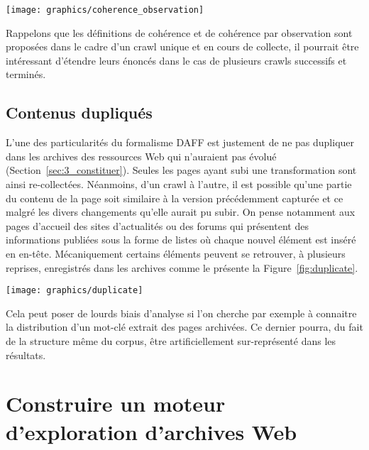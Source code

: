 \documentclass[symmetric,justified,marginals=raggedouter]{tufte-book}
\begin{document}
\begin{figure*}%
  \texttt{[image: graphics/coherence\_observation]}
  \caption{Cohérence par observation entre les pages $p_1$ et $p_2$ et intervalle de cohérence (jaune)}
  \label{fig:coherence}
\end{figure*}

\noindent Rappelons que les définitions de cohérence et de cohérence par observation sont proposées dans le cadre d'un crawl unique et en cours de collecte, il pourrait être intéressant d'étendre leurs énoncés dans le cas de plusieurs crawls successifs et terminés.

\newpage

\subsection{Contenus dupliqués}

\noindent L'une des particularités du formalisme DAFF est justement de ne pas dupliquer dans les archives des ressources Web qui n'auraient pas évolué (Section~\ref{sec:3_constituer}). Seules les pages ayant subi une transformation sont ainsi re-collectées. Néanmoins, d'un crawl à l'autre, il est possible qu'une partie du contenu de la page soit similaire à la version précédemment capturée et ce malgré les divers changements qu'elle aurait pu subir. On pense notamment aux pages d'accueil des sites d'actualités ou des forums qui présentent des informations publiées sous la forme de listes où chaque nouvel élément est inséré en en-tête. Mécaniquement certains éléments peuvent se retrouver, à plusieurs reprises, enregistrés dans les archives comme le présente la Figure~\ref{fig:duplicate}.

\begin{figure*}%
  \texttt{[image: graphics/duplicate]}
  \caption{Contenu d'une page (en rouge) collecté plusieurs fois}
  \label{fig:duplicate}
\end{figure*}

\noindent Cela peut poser de lourds biais d'analyse si l'on cherche par exemple à connaitre la distribution d'un mot-clé extrait des pages archivées. Ce dernier pourra, du fait de la structure même du corpus, être artificiellement sur-représenté dans les résultats. 

\section{Construire un moteur d'exploration d'archives Web}
\label{sec:4_moteur}
\end{document}

